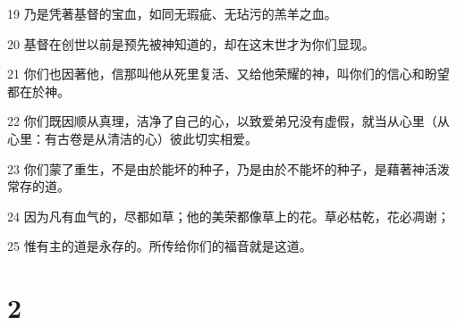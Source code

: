 \par 19 乃是凭著基督的宝血，如同无瑕疵、无玷污的羔羊之血。
\par 20 基督在创世以前是预先被神知道的，却在这末世才为你们显现。
\par 21 你们也因著他，信那叫他从死里复活、又给他荣耀的神，叫你们的信心和盼望都在於神。
\par 22 你们既因顺从真理，洁净了自己的心，以致爱弟兄没有虚假，就当从心里（从心里：有古卷是从清洁的心）彼此切实相爱。
\par 23 你们蒙了重生，不是由於能坏的种子，乃是由於不能坏的种子，是藉著神活泼常存的道。
\par 24 因为凡有血气的，尽都如草；他的美荣都像草上的花。草必枯乾，花必凋谢；
\par 25 惟有主的道是永存的。所传给你们的福音就是这道。

\chapter{2}

